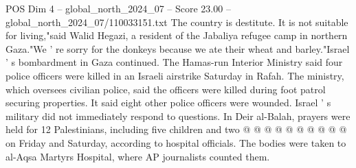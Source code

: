 \begin{textsample}{POS Dim 4 – global\_north\_2024\_07 – Score 23.00 – global\_north\_2024\_07/110033151.txt}
The country is destitute.
It is not suitable for living,"said Walid Hegazi, a resident of the Jabaliya refugee camp in northern Gaza."We ' re sorry for the donkeys because we ate their wheat and barley."Israel ' s bombardment in Gaza continued.
The Hamas-run Interior Ministry said four police officers were killed in an Israeli airstrike Saturday in Rafah.
The ministry, which oversees civilian police, said the officers were killed during foot patrol securing properties.
It said eight other police officers were wounded.
Israel ' s military did not immediately respond to questions.
In Deir al-Balah, prayers were held for 12 Palestinians, including five children and two @ @ @ @ @ @ @ @ @ @ on Friday and Saturday, according to hospital officials.
The bodies were taken to al-Aqsa Martyrs Hospital, where AP journalists counted them.

\end{textsample}
